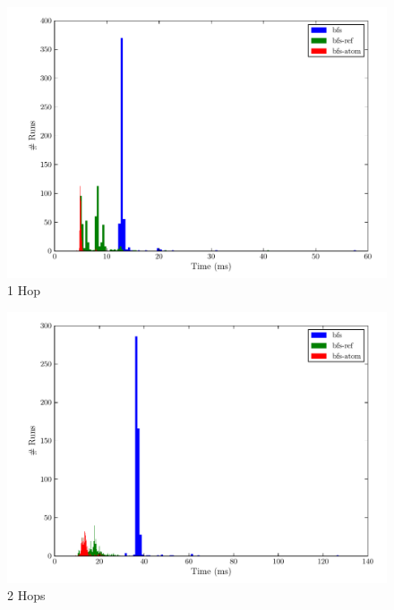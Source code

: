 \documentclass[12pt,letterpaper,oneside]{report}
\theoremstyle{definition}
\begin{document}
		
		\begin{figure}[!ht]
			\centering
			\includegraphics[scale=0.85]{1_hops}
			\caption{1 Hop}
			\label{fig:perf-1-hop}
		\end{figure}
		
		\begin{figure}[!ht]
			\centering
			\includegraphics[scale=0.85]{2_hops}
			\caption{2 Hops}
			\label{fig:perf-2-hops}
		\end{figure}
		
\end{document}
